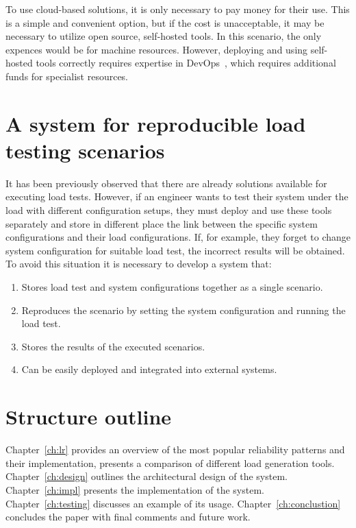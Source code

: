 To use cloud-based solutions, it is only necessary to pay money for their use. This is a simple and convenient option, but if the cost is unacceptable, it may be necessary to utilize open source, self-hosted tools. In this scenario, the only expences would be for machine resources. However, deploying and using self-hosted tools correctly requires expertise in DevOps~\cite{devops}, which requires additional funds for specialist resources.


\section{A system for reproducible load testing scenarios}\label{sec:purpose}
It has been previously observed that there are already solutions available for executing load tests. However, if an engineer wants to test their system under the load with different configuration setups, they must deploy and use these tools separately and store in different place the link between the specific system configurations and their load configurations. If, for example, they forget to change system configuration for suitable load test, the incorrect results will be obtained. To avoid this situation it is necessary to develop a system that:
\begin{enumerate}
    \item Stores load test and system configurations together as a single scenario.
    \item Reproduces the scenario by setting the system configuration and running the load test.
    \item Stores the results of the executed scenarios.
    \item Can be easily deployed and integrated into external systems.
\end{enumerate}


\section{Structure outline}\label{sec:structure-outline}
Chapter~\ref{ch:lr} provides an overview of the most popular reliability patterns and their implementation, presents a comparison of different load generation tools. Chapter~\ref{ch:design} outlines the architectural design of the system. Chapter~\ref{ch:impl} presents the implementation of the system. Chapter~\ref{ch:testing} discusses an example of its usage. Chapter~\ref{ch:conclustion} concludes the paper with final comments and future work.